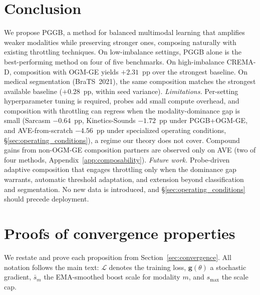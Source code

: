 \documentclass{article}
\newcommand{\loss}{\mathcal{L}}
\begin{document}
\section{Conclusion}
\label{sec:conclusion}

We propose PGGB, a method for balanced multimodal learning that amplifies weaker modalities while preserving stronger ones, composing naturally with existing throttling techniques. On low-imbalance settings, PGGB alone is the best-performing method on four of five benchmarks. On high-imbalance CREMA-D, composition with OGM-GE yields $+2.31$~pp over the strongest baseline. On medical segmentation (BraTS~2021), the same composition matches the strongest available baseline ($+0.28$~pp, within seed variance). \emph{Limitations.} Per-setting hyperparameter tuning is required, probes add small compute overhead, and composition with throttling can regress when the modality-dominance gap is small (Sarcasm $-0.64$~pp, Kinetics-Sounds $-1.72$~pp under PGGB+OGM-GE, and AVE-from-scratch $-4.56$~pp under specialized operating conditions, \S\ref{sec:operating_conditions}), a regime our theory does not cover. Compound gains from non-OGM-GE composition partners are observed only on AVE (two of four methods, Appendix~\ref{app:composability}). \emph{Future work.} Probe-driven adaptive composition that engages throttling only when the dominance gap warrants, automatic threshold adaptation, and extension beyond classification and segmentation. No new data is introduced, and \S\ref{sec:operating_conditions} should precede deployment.


\newpage





\clearpage
\appendix

\section{Proofs of convergence properties}
\label{app:proofs}

We restate and prove each proposition from Section~\ref{sec:convergence}. All notation follows the main text: $\loss$ denotes the training loss, $\mathbf{g}(\theta)$ a stochastic gradient, $\bar{s}_m$ the EMA-smoothed boost scale for modality $m$, and $s_{\max}$ the scale cap.
\end{document}
